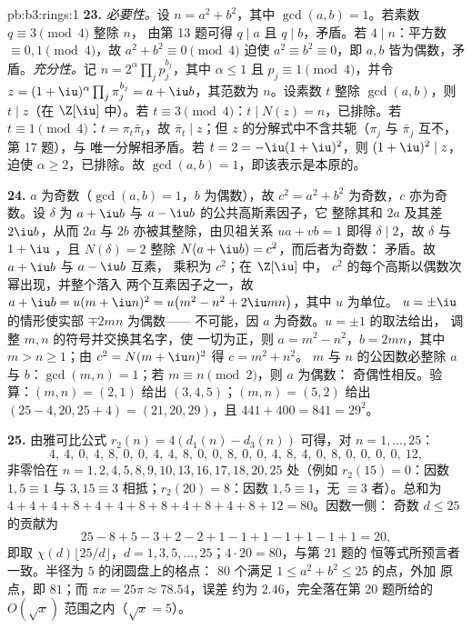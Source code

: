 \begin{solution}{pb:b3:rings:1}
\textbf{23.} \emph{必要性。}设 $n = a^2 + b^2$，其中
$\gcd(a, b) = 1$。若素数 $q \equiv 3 \pmod 4$ 整除 $n$，
由第 13 题可得 $q \mid a$ 且 $q \mid b$，矛盾。若
$4 \mid n$：平方数 $\equiv 0, 1 \pmod 4$，故 $a^2 + b^2
\equiv 0 \pmod 4$ 迫使 $a^2 \equiv b^2 \equiv 0$，即 $a,
b$ 皆为偶数，矛盾。\emph{充分性。}记 $n =
2^{\alpha}\prod_jp_j^{b_j}$，其中 $\alpha \leq 1$ 且 $p_j
\equiv 1 \pmod 4$，并令 $z = (1+\iu)^{\alpha}\prod_j
\pi_j^{b_j} = a + \iu b$，其范数为 $n$。设素数 $t$
整除 $\gcd(a, b)$，则 $t \mid z$（在 $\Z[\iu]$ 中）。若 $t
\equiv 3 \pmod 4$：$t \mid N(z) = n$，已排除。若 $t \equiv 1
\pmod 4$：$t = \pi_t\bar\pi_t$，故 $\bar\pi_t \mid z$；但
$z$ 的分解式中不含共轭（$\pi_j$ 与
$\bar\pi_j$ 互不，第 17 题），与
唯一分解相矛盾。若 $t = 2 = -\iu(1+\iu)^2$，则
$(1+\iu)^2 \mid z$，迫使 $\alpha \geq 2$，已排除。故
$\gcd(a, b) = 1$，即该表示是本原的。

\textbf{24.} $a$ 为奇数（$\gcd(a, b) = 1$，$b$ 为偶数），故 $c^2
= a^2 + b^2$ 为奇数，$c$ 亦为奇数。设 $\delta$ 为
$a + \iu b$ 与 $a - \iu b$ 的公共高斯素因子，它
整除其和 $2a$ 及其差 $2\iu b$，从而
$2a$ 与 $2b$ 亦被其整除，由贝祖关系 $ua + vb = 1$ 即得
$\delta \mid 2$，故 $\delta$ 与 $1 + \iu$ ，且
$N(\delta) = 2$ 整除 $N(a + \iu b) = c^2$，而后者为奇数：
矛盾。故 $a + \iu b$ 与 $a - \iu b$ 互素，
乘积为 $c^2$；在 $\Z[\iu]$ 中，
$c^2$ 的每个高斯以偶数次幂出现，并整个落入
两个互素因子之一，故 $a + \iu b = u(m + \iu
n)^2 = u\bigl(m^2 - n^2 + 2\iu mn\bigr)$，其中 $u$ 为单位。
$u = \pm\iu$ 的情形使实部 $\mp 2mn$ 为偶数——
不可能，因 $a$ 为奇数。$u = \pm1$ 的取法给出，
调整 $m, n$ 的符号并交换其名字，使
一切为正，则 $a = m^2 - n^2$，$b = 2mn$，其中 $m > n
\geq 1$；由 $c^2 = N(m + \iu n)^2$ 得 $c = m^2 + n^2$。
$m$ 与 $n$ 的公因数必整除 $a$ 与 $b$：$\gcd
(m, n) = 1$；若 $m \equiv n \pmod 2$，则 $a$ 为偶数：
奇偶性相反。验算：$(m, n) = (2, 1)$ 给出 $(3, 4,
5)$；$(m, n) = (5, 2)$ 给出 $(25 - 4, 20, 25 + 4) = (21, 20,
29)$，且 $441 + 400 = 841 = 29^2$。

\textbf{25.} 由雅可比公式 $r_2(n) = 4(d_1(n) - d_3(n))$
可得，对 $n = 1, \dots, 25$：
\[
4,\ 4,\ 0,\ 4,\ 8,\ 0,\ 0,\ 4,\ 4,\ 8,\ 0,\ 0,\ 8,\ 0,\ 0,\
4,\ 8,\ 4,\ 0,\ 8,\ 0,\ 0,\ 0,\ 0,\ 12,
\]
非零恰在 $n = 1, 2, 4, 5, 8, 9, 10, 13, 16, 17, 18,
20, 25$ 处（例如 $r_2(15) = 0$：因数 $1, 5 \equiv 1$
与 $3, 15 \equiv 3$ 相抵；$r_2(20) = 8$：因数 $1, 5
\equiv 1$，无 $\equiv 3$ 者）。总和为 $4 + 4 + 4 + 8 + 4 +
4 + 8 + 8 + 4 + 8 + 4 + 8 + 12 = 80$。因数一侧：
奇数 $d \leq 25$ 的贡献为
\[
25 - 8 + 5 - 3 + 2 - 2 + 1 - 1 + 1 - 1 + 1 - 1 + 1 = 20,
\]
即取 $\chi(d)\lfloor 25/d\rfloor$，$d = 1, 3, 5, \dots,
25$；$4 \cdot 20 = 80$，与第 21 题的
恒等式所预言者一致。半径为 $5$ 的闭圆盘上的格点：
$80$ 个满足 $1 \leq a^2 + b^2 \leq 25$ 的点，外加
原点，即 $81$；而 $\pi x = 25\pi \approx 78.54$，误差
约为 $2.46$，完全落在第 20 题所给的 $O(\sqrt x)$
范围之内（$\sqrt x = 5$）。
\end{solution}
